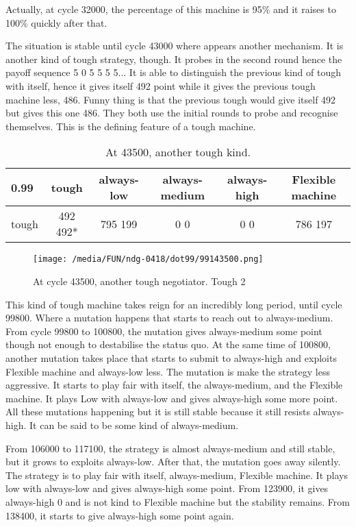\documentclass[12.5pt]{report}
\begin{document}
Actually, at cycle 32000, the percentage of this machine is 95\% and it raises to 100\% quickly after that.

The situation is stable until cycle 43000 where appears another mechanism. It is another kind of tough strategy, though. It probes in the second round hence the payoff sequence 5 0 5 5 5 5... It is able to distinguish the previous kind of tough with itself, hence it gives itself 492 point while it gives the previous tough machine less, 486. Funny thing is that the previous tough would give itself 492 but gives this one 486. They both use the initial rounds to probe and recognise themselves. This is the defining feature of a tough machine.

\begin{table}[h!]
\center
\begin{tabular}{l|ccccc}
\textbf{0.99}& tough & always-low & always-medium & always-high & Flexible machine\\
\hline
tough & 492 492* & 795 199  &  0 0  & 0 0  &  786 197  \\
\end{tabular}
\caption{At 43500, another tough kind.}
\end{table}
\begin{figure}[h!]
\center
\texttt{[image: /media/FUN/ndg-0418/dot99/99143500.png]}
\caption{At cycle 43500, another tough negotiator. Tough 2}
\end{figure}

This kind of tough machine takes reign for an incredibly long period, until cycle 99800. Where a mutation happens that starts to reach out to always-medium. From cycle 99800 to 100800, the mutation gives always-medium some point though not enough to destabilise the status quo. At the same time of 100800, another mutation takes place that starts to submit to always-high and exploits Flexible machine and always-low less. The mutation is make the strategy less aggressive. It starts to play fair with itself, the always-medium, and the Flexible machine. It plays Low with always-low and gives always-high some more point. All these mutations happening but it is still stable because it still resists always-high. It can be said to be some kind of always-medium.

From 106000 to 117100, the strategy is almost always-medium and still stable, but it grows to exploits always-low. After that, the mutation goes away silently. The strategy is to play fair with itself, always-medium, Flexible machine. It plays low with always-low and gives always-high some point. From 123900, it gives always-high 0 and is not kind to Flexible machine but the stability remains. From 138400, it starts to give always-high some point again.
\end{document}
